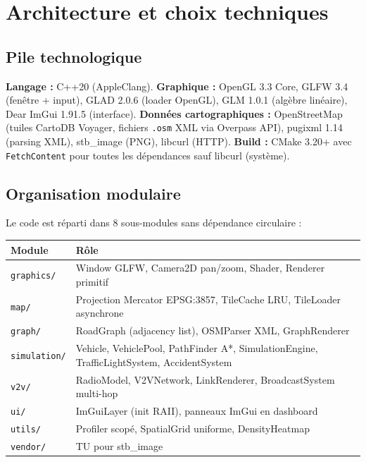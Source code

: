 \documentclass[a4paper,11pt]{article}
\begin{document}
\section{Architecture et choix techniques}

\subsection{Pile technologique}

\begin{tcolorbox}[card=Stack]
\textbf{Langage :} C++20 (AppleClang).
\textbf{Graphique :} OpenGL 3.3 Core, GLFW 3.4 (fen\^etre + input), GLAD 2.0.6
(loader OpenGL), GLM 1.0.1 (alg\`ebre lin\'eaire), Dear ImGui 1.91.5
(interface).
\textbf{Donn\'ees cartographiques :} OpenStreetMap (tuiles CartoDB Voyager,
fichiers \texttt{.osm} XML via Overpass API), pugixml 1.14 (parsing XML),
stb\_image (PNG), libcurl (HTTP).
\textbf{Build :} CMake 3.20+ avec \texttt{FetchContent} pour toutes les
d\'ependances sauf libcurl (syst\`eme).
\end{tcolorbox}

\subsection{Organisation modulaire}

Le code est r\'eparti dans 8 sous-modules sans d\'ependance circulaire :

\begin{center}\small
\renewcommand{\arraystretch}{1.2}
\begin{tabularx}{\linewidth}{l X}
\toprule\rowcolor{soft}
\textbf{Module} & \textbf{R\^ole}\\
\midrule
\texttt{graphics/}   & Window GLFW, Camera2D pan/zoom, Shader, Renderer primitif\\
\texttt{map/}        & Projection Mercator EPSG:3857, TileCache LRU, TileLoader asynchrone\\
\texttt{graph/}      & RoadGraph (adjacency list), OSMParser XML, GraphRenderer\\
\texttt{simulation/} & Vehicle, VehiclePool, PathFinder A*, SimulationEngine, TrafficLightSystem, AccidentSystem\\
\texttt{v2v/}        & RadioModel, V2VNetwork, LinkRenderer, BroadcastSystem multi-hop\\
\texttt{ui/}         & ImGuiLayer (init RAII), panneaux ImGui en dashboard\\
\texttt{utils/}      & Profiler scop\'e, SpatialGrid uniforme, DensityHeatmap\\
\texttt{vendor/}     & TU pour stb\_image\\
\bottomrule
\end{tabularx}
\end{center}
\end{document}
